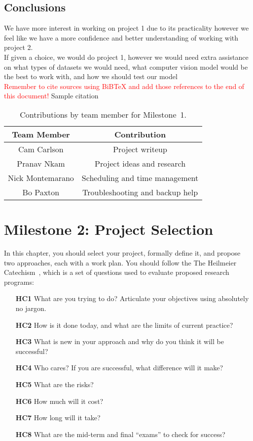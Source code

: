 \documentclass{report}
\begin{document}
\section{Conclusions}

We have more interest in working on project 1 due to its practicality however we feel like we have a more confidence and better understanding of working with project 2. 
\\
If given a choice, we would do project 1, however we would need extra assistance on what types of datasets we would need, what computer vision model would be the best to work with, and how we should test our model 
\\
\textcolor{red}{Remember to cite sources using BiBTeX and add those references to the end of this document!}
Sample citation~\cite{Samuel59}

\begin{table}[]
    \caption{Contributions by team member for Milestone~1.}
    \centering
    \begin{tabular}{|c|c|} \hline
    {\bf Team Member}     &  {\bf Contribution}  \\ \hline
    Cam Carlson     &  Project writeup \\
    Pranav Nkam     &  Project ideas and research \\
    Nick Montemarano     &   Scheduling and time management \\ 
    Bo Paxton
    &
Troubleshooting and backup help
    \end{tabular}
    \label{tab:contribution1}
\end{table}


\chapter{Milestone 2: Project Selection}

In this chapter, you should select your project, formally define it, and propose two approaches, each with a work plan.  You should follow the The Heilmeier Catechism~\cite{heilmeier}, which is a set of questions used to evaluate proposed research programs:  
\begin{enumerate}
    \item[{\bf HC1}] What are you trying to do? Articulate your objectives using absolutely no jargon.
   \item[{\bf HC2}] How is it done today, and what are the limits of current practice?
   \item[{\bf HC3}] What is new in your approach and why do you think it will be successful?
   \item[{\bf HC4}] Who cares? If you are successful, what difference will it make?
   \item[{\bf HC5}] What are the risks?
   \item[{\bf HC6}] How much will it cost?
   \item[{\bf HC7}] How long will it take?
   \item[{\bf HC8}] What are the mid-term and final ``exams'' to check for success?
\end{enumerate}
\end{document}
